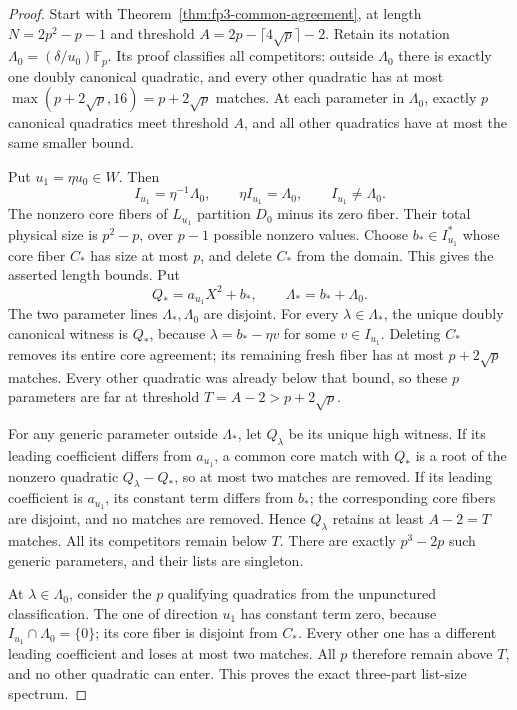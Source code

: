 \begin{proof}
Start with Theorem~\ref{thm:fp3-common-agreement}, at length
$N=2p^2-p-1$ and threshold $A=2p-\lceil4\sqrt p\rceil-2$.
Retain its notation $\Lambda_0=(\delta/u_0)\mathbb F_p$.
Its proof classifies all competitors: outside $\Lambda_0$ there is
exactly one doubly canonical quadratic, and every other quadratic has
at most $\max(p+2\sqrt p,16)=p+2\sqrt p$ matches. At each parameter
in $\Lambda_0$, exactly $p$ canonical quadratics meet threshold $A$,
and all other quadratics have at most the same smaller bound.

Put $u_1=\eta u_0\in W$. Then
\[
 I_{u_1}=\eta^{-1}\Lambda_0,\qquad
 \eta I_{u_1}=\Lambda_0,\qquad I_{u_1}\ne\Lambda_0.
\]
The nonzero core fibers of $L_{u_1}$ partition $D_0$ minus its zero
fiber. Their total physical size is $p^2-p$, over $p-1$ possible
nonzero values. Choose $b_*\in I_{u_1}^*$ whose core fiber $C_*$ has
size at most $p$, and delete $C_*$ from the domain. This gives
the asserted length bounds. Put
\[
 Q_*=a_{u_1}X^2+b_*,\qquad \Lambda_*=b_*+\Lambda_0.
\]
The two parameter lines $\Lambda_*,\Lambda_0$ are disjoint.
For every $\lambda\in\Lambda_*$, the unique doubly canonical witness
is $Q_*$, because $\lambda=b_*-\eta v$ for some $v\in I_{u_1}$.
Deleting $C_*$ removes its entire core agreement; its remaining fresh
fiber has at most $p+2\sqrt p$ matches. Every other quadratic was
already below that bound, so these $p$ parameters are far at threshold
$T=A-2>p+2\sqrt p$.

For any generic parameter outside $\Lambda_*$, let $Q_\lambda$ be its
unique high witness. If its leading coefficient differs from
$a_{u_1}$, a common core match with $Q_*$ is a root of the nonzero
quadratic $Q_\lambda-Q_*$, so at most two matches are removed.
If its leading coefficient is $a_{u_1}$, its constant term differs
from $b_*$; the corresponding core fibers are disjoint, and no matches
are removed. Hence $Q_\lambda$ retains at least $A-2=T$ matches.
All its competitors remain below $T$. There are exactly $p^3-2p$
such generic parameters, and their lists are singleton.

At $\lambda\in\Lambda_0$, consider the $p$ qualifying quadratics
from the unpunctured classification. The one of direction $u_1$ has
constant term zero, because $I_{u_1}\cap\Lambda_0=\{0\}$; its core
fiber is disjoint from $C_*$. Every other one has a different leading
coefficient and loses at most two matches. All $p$ therefore remain
above $T$, and no other quadratic can enter. This proves the exact
three-part list-size spectrum.


\end{proof}
